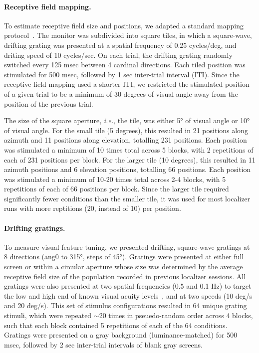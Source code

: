 \paragraph{Receptive field mapping.}
To estimate receptive field size and positions, we adapted a standard mapping protocol~\cite{Marques2018}. The monitor was subdivided into square tiles, in which a square-wave, drifting grating was presented at a spatial frequency of 0.25 cycles/deg, and driting speed of 10 cycles/sec. On each trial, the drifting grating randomly switched every 125 msec between 4 cardinal directions. Each tiled position was stimulated for 500 msec, followed by 1 sec inter-trial interval (ITI). Since the receptive field mapping used a shorter ITI, we restricted the stimulated position of a given trial to be a minimum of 30 degrees of visual angle away from the position of the previous trial. 

The size of the square aperture, \textit{i.e.}, the tile, was either \ang{5} of visual angle or \ang{10} of visual angle. For the small tile (5 degrees), this resulted in 21 positions along azimuth and 11 positions along elevation, totalling 231 positions. Each position was stimulated a minimum of 10 times total across 5 blocks, with 2 repetitions of each of 231 positions per block. For the larger tile (10 degrees), this resulted in 11 azimuth positions and 6 elevation positions, totalling 66 positions. Each position was stimulated a minimum of 10-20 times total across 2-4 blocks, with 5 repetitions of each of 66 positions per block. Since the larger tile required significantly fewer conditions than the smaller tile, it was used for most localizer runs with more reptitions (20, instead of 10) per position. 

\paragraph{Drifting gratings.}
To measure visual feature tuning, we presented drifting, square-wave gratings at 8 directions (ang{0} to \ang{315}, steps of \ang{45}). Gratings were presented at either full screen or within a circular aperture whose size was determined by the average receptive field size of the population recorded in previous localizer sessions. All gratings were also presented at two spatial frequencies (0.5 and 0.1 Hz) to target the low and high end of known visual acuity levels~\cite{Prusky2000}, and at two speeds (10 deg/s and 20 deg/s). This set of stimulus configurations resulted in 64 unique grating stimuli, which were repeated $\sim$20 times in pseuedo-random order across 4 blocks, such that each block contained 5 repetitions of each of the 64 conditions. Gratings were presented on a gray background (luminance-matched) for 500 msec, followed by 2 sec inter-trial intervals of blank gray screens. 

